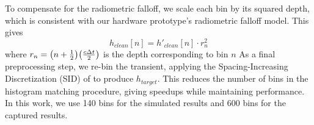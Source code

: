 To compensate for the radiometric falloff, we scale each bin by its squared depth,
which is consistent with our hardware prototype's radiometric falloff model.
This gives
\begin{equation}
  h_{clean}[n] = h'_{clean}[n] \cdot r_n^2
  \label{eq:h_scaled}
\end{equation}
where $r_n= \paren*{n + \frac12}\paren*{\frac{c\Delta t}{2}}$ is the depth
corresponding to bin $n$
As a final preprocessing step, we re-bin the transient, applying the Spacing-Increasing Discretization
(SID) of \cite{Fu2018} to produce $h_{target}$. This reduces the number of bins in the histogram
matching procedure, giving speedups while maintaining performance. In this work,
we use 140 bins for the simulated results and 600 bins for the captured results.



